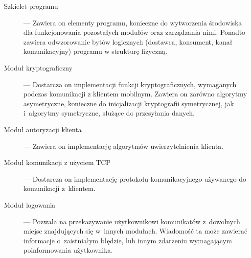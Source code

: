 \begin{description}
\item[Szkielet programu] --- Zawiera on elementy programu, konieczne do
  wytworzenia środowiska dla funkcjonowania pozostałych modułów oraz
  zarządzania nimi. Ponadto zawiera odwzorowanie bytów logicznych
  (dostawca, konsument, kanał komunikacyjny) programu w strukturę
  fizyczną.
\item[Moduł kryptograficzny] --- Dostarcza on implementacji funkcji
  kryptograficznych, wymaganych podczas komunikacji z klientem
  mobilnym. Zawiera on zarówno algorytmy asymetryczne, konieczne do
  inicjalizacji kryptografii symetrycznej, jak i~algorytmy symetryczne,
  służące do przesyłania danych.
\item[Moduł autoryzacji klienta] --- Zawiera on implementację algorytmów
  uwierzytelnienia klienta.
\item[Moduł komunikacji z użyciem TCP] --- Dostarcza on implementację
  protokołu komunikacyjnego używanego do komunikacji z~klientem.
\item[Moduł logowania] --- Pozwala na przekazywanie użytkownikowi
  komunikatów z~dowolnych miejsc znajdujących się w~innych
  modułach. Wiadomość ta może zawierać informacje o~zaistniałym
  błędzie, lub innym zdarzeniu wymagającym poinformowania użytkownika.
\end{description}


